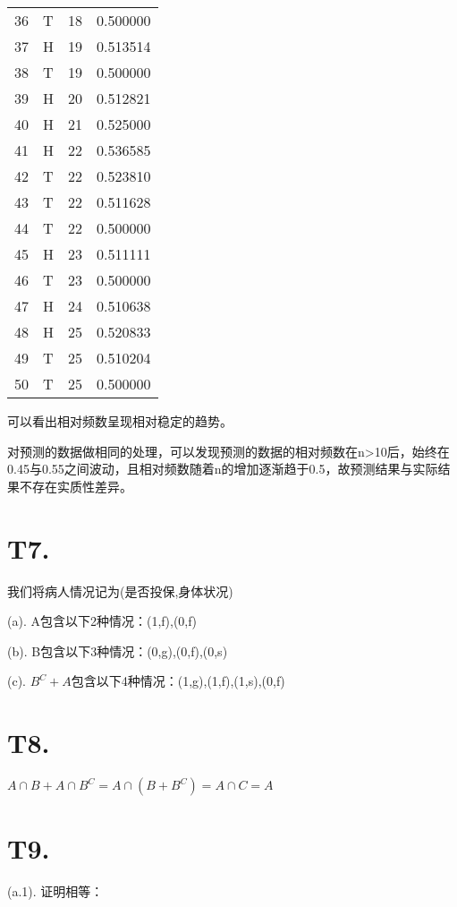 \documentclass[utf8]{article}
\begin{document}
\begin{longtable}{|l|l|l|l|}
        36 & T & 18 & 0.500000 \\
        37 & H & 19 & 0.513514 \\
        38 & T & 19 & 0.500000 \\
        39 & H & 20 & 0.512821 \\
        40 & H & 21 & 0.525000 \\
        41 & H & 22 & 0.536585 \\
        42 & T & 22 & 0.523810 \\
        43 & T & 22 & 0.511628 \\
        44 & T & 22 & 0.500000 \\
        45 & H & 23 & 0.511111 \\
        46 & T & 23 & 0.500000 \\
        47 & H & 24 & 0.510638 \\
        48 & H & 25 & 0.520833 \\
        49 & T & 25 & 0.510204 \\
        50 & T & 25 & 0.500000 \\
\end{longtable}

可以看出相对频数呈现相对稳定的趋势。

对预测的数据做相同的处理，可以发现预测的数据的相对频数在n>10后，始终在0.45与0.55之间波动，且相对频数随着n的增加逐渐趋于0.5，故预测结果与实际结果不存在实质性差异。

\section*{T7. }

我们将病人情况记为(是否投保,身体状况)

(a). A包含以下2种情况：(1,f),(0,f)

(b). B包含以下3种情况：(0,g),(0,f),(0,s)

(c). $B^C+A$包含以下4种情况：(1,g),(1,f),(1,s),(0,f)

\section*{T8. }

$A\cap B+A\cap B^C=A\cap (B+B^C)=A\cap C=A$

\section*{T9. }

(a.1). 证明相等：
\end{document}
